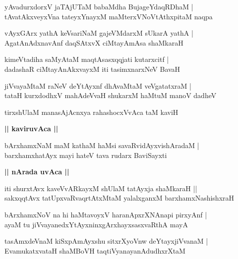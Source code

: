 \documentclass[twoside,12pt,openright]{book}
\newcounter{shloka}[chapter]
\def\uvaca#1{\centerline{{\large\textbf{#1}}}}
\begin{document}
\begin{shloka}%
yAvadurxdorxV jaTAjUTaM babaMdha BujageYdaqRDhaM |\\
tAvatAkxveyxVna tateyxYnayxM maMterxVNoVtAthxpitaM naqpa 
\end{shloka}

\begin{shloka}%
vAyxGArx yathA keVsariNaM gajeVMdarxM sUkarA yathA |\\
AgatAnAdxnavAnf daqSAtxvX ciMtayAmAsa shaMkaraH 
\end{shloka}

\begin{shloka}%
kimeVtadiha saMyAtaM maqtAsasxqqjati kutarxcitf |\\
dadashaR ciMtayAnAkxvayxM iti tasimxnarxNeV BavaH 
\end{shloka}

\begin{shloka}%
jiVvayaMtaM raNeV deYtAyxnf dhAvaMtaM veVgatatxraM |\\
tataH kurxdodhxV mahAdeVvaH shukarxM haMtuM manoV dadheV 
\end{shloka}

\begin{shloka}%
tirxshUlaM manasAjAcnxya rahashocxVvAca taM kaviH
\end{shloka}

\uvaca{|| kaviruvAca ||}

\begin{shloka}%
bArxhamxNaM maM kathaM haMsi savaRvidAyxvishAradaM |\\
barxhamxhatAyx mayi hateV tava rudarx BaviSayxti 
\end{shloka}

\uvaca{|| nArada uvAca ||}

\begin{shloka}%
iti shurxtAvx kaveVvARkayxM shUlaM tatAyxja shaMkaraH ||\\
sakxqqtAvx tatUpxvaRvaqrtAtxMtaM yalalxganxM barxhamxNashishxraH 
\end{shloka}

\begin{shloka}%
bArxhamxNoV na hi haMtavoyxV haranApxrXNAnapi pirxyAnf |\\
ayaM tu jiVvayanedxYtAyxninxgArxhayxsasxvaRthA mayA 
\end{shloka}

\begin{shloka}%
tasAmxdeVnaM kiSxpAmAyxshu sitxrXyoVnw deYtayxjiVvanaM |\\
EvamukatxvataH shaMBoVH taqtiVyanayanAdudhxrXtaM 
\end{shloka}
\end{document}
